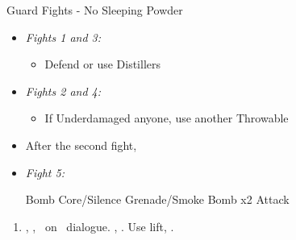 \begin{battle}{Guard Fights - No Sleeping Powder}
	\begin{itemize}
		\item \textit{Fights 1 and 3:}
		      \begin{itemize}
			      \tidusf Attack
			      \item Defend or use Distillers
		      \end{itemize}
		\item \textit{Fights 2 and 4:}
		      \begin{itemize}
			      \switch{\tidus}{\kimahri}
			      \kimahrif Bomb Core/Silence Grenade/Smoke Bomb
			      \switch{\rikku}{\tidus}
			      \tidusf Attack
			      \kimahrif Repeat
			      \item If Underdamaged anyone, use another Throwable
		      \end{itemize}
		\item After the second fight, \formation{\tidus}{\rikku}{\lulu}
		\item \textit{Fight 5:}
		      \begin{itemize}
			      \switch{\tidus}{\rikku}
			      \rikkuf Bomb Core/Silence Grenade/Smoke Bomb x2
			      \switch{\kimahri}{\tidus}
			      \tidusf Attack
		      \end{itemize}
	\end{itemize}
\end{battle}
\begin{enumerate}[resume]
	\item \sd, \fmv[1:30], \sd\ on \yuna\ dialogue. \skippablefmv[30], \sd. Use lift, \sd.
\end{enumerate}
